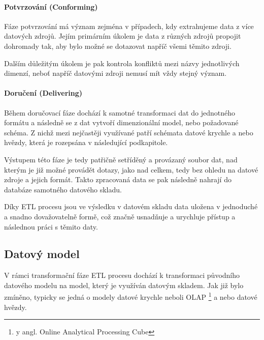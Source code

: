 \documentclass[
  digital,     %
  twoside,     %
  lof,         %
  lot,         %
]{fithesis4}
\begin{document}
\paragraph{Potvrzování (Conforming)}
Fáze potvrzování má význam zejména v případech, kdy extrahujeme data z více datových zdrojů. Jejím primárním úkolem je data z různých zdrojů propojit dohromady tak, aby bylo možné se dotazovat napříč všemi těmito zdroji. \parencite[s.~19]{Kimballc2004}

Dalším důležitým úkolem je pak kontrola konfliktů mezi názvy jednotlivých dimenzí, neboť napříč datovými zdroji nemusí mít vždy stejný význam. \parencite{Kimballc2004}

\paragraph{Doručení (Delivering)}
Během doručovací fáze dochází k samotné transformaci dat do jednotného formátu a následně se z dat vytvoří dimenzionální model, nebo požadované schéma. Z nichž mezi nejčastěji využívané patří schémata datové krychle a nebo hvězdy, která je rozepsána v následující podkapitole.\parencite[s.~19]{Kimballc2004}

Výstupem této fáze je tedy patřičně setříděný a provázaný soubor dat, nad kterým je již možné provádět dotazy, jako nad celkem, tedy bez ohledu na datové zdroje a jejich formát. Takto zpracovaná data se pak následně nahrají do databáze samotného datového skladu.

Díky ETL procesu jsou ve výsledku v datovém skladu data uložena v jednoduché a snadno dovažovatelně formě, což značně usnadňuje a urychluje přístup a následnou práci s těmito daty.

\subsection{Datový model}
V rámci transformační fáze ETL procesu dochází k transformaci původního datového modelu na model, který je využíván datovým skladem. Jak již bylo zmíněno, typicky se jedná o modely datové krychle neboli OLAP \footnote{y angl. Online Analytical Processing Cube} a nebo datové hvězdy. 
\end{document}
